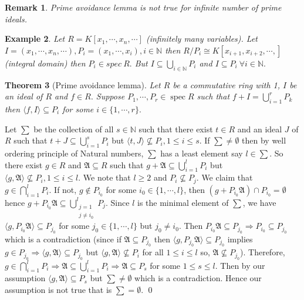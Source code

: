 \documentclass[11pt]{amsart}
\newtheorem{theorem}{Theorem}[section]
\newtheorem{example}[theorem]{Example}%
\newtheorem{remark}[theorem]{Remark}%
\newcommand{\NN}{\mathbb N}
\newcommand{\gen}[1]{\langle#1\rangle}
\DeclareMathOperator{\spec}{\text{spec}}
\begin{document}
\begin{remark}

Prime avoidance lemma is not true for infinite number of prime ideals.

\end{remark}

\begin{example}

Let $R=K[x_1,\cdots ,x_n,\cdots]$ (infinitely many variables). Let $I=(x_1,\cdots ,x_n,\cdots ),P_i=(x_1,\cdots ,x_i),i\in {\NN}$ then $R/P_i\cong K[x_{i+1},x_{i+2},\cdots ,]$ (integral domain) then $P_i\in spec~R.$ But $I\subseteq \displaystyle\bigcup_{i\in {\NN}} P_i$ and $I\subseteq P_i~\forall i\in {\NN}.$

\end{example}

\begin{theorem}[Prime avoidance lemma]

Let $R$ be a commutative ring with 1, $I$ be an ideal of $R$ and $f\in R.$ Suppose $P_1,\cdots,P_r\in\spec R$ such that $f+I=\displaystyle\bigcup_{i=1}^r P_k$ then $\gen{f,I}\subseteq P_i$ for some $i\in\{1,\cdots,r\}.$

\end{theorem}

\proof Let $\displaystyle\sum$ be the collection of all $s\in{\NN}$ such that there exist $t\in R$ and an ideal $J$ of $R$ such that $t+J\subseteq \displaystyle\bigcup_{i=1}^s P_i$ but $\gen{t,J}\nsubseteq P_i,1\leq i\leq s.$ If $\displaystyle\sum\neq\emptyset$ then by well ordering principle of Natural numbers, $\displaystyle\sum$ has a least element say $l\in \displaystyle\sum.$ So there exist $g\in R$ and $\mathfrak{A}\subseteq R$ such that $g+\mathfrak{A}\subseteq \displaystyle\bigcup_{i=1}^l P_i$ but $\gen{g,\mathfrak{A}}\nsubseteq P_i,1\leq i\leq l.$ We note that $l\geq 2$ and $P_i\nsubseteq P_j.$ We claim that $g\in\displaystyle\bigcap_{i=1}^l P_i.$ If not, $g\notin P_{i_0}$ for some $i_0\in\{1,\cdots,l\}$, then $(g+P_{i_0}\mathfrak{A})\cap P_{i_0}=\emptyset$ hence $g+P_{i_0}\mathfrak{A}\subseteq \displaystyle\bigcup_{\substack{j=1\\j\neq i_0}}^l P_j.$ Since $l$ is the minimal element of $\displaystyle\sum$, we have $\gen{g,P_{i_0}\mathfrak{A}}\subseteq P_{j_0}$ for some $j_0\in\{1,\cdots, l\}$ but $j_0\neq i_0.$ Then $P_{i_0}\mathfrak{A}\subseteq P_{j_0} \Rightarrow P_{i_0}\subseteq P_{j_0}$ which is a contradiction (since if $\mathfrak{A}\subseteq P_{j_0}$ then $\gen{g,P_{j_0}\mathfrak{A}}\subseteq P_{j_0}$ implies $g\in P_{j_0} \Rightarrow \gen{g,\mathfrak{A}}\subseteq P_{j_0}$ but $\gen{g,\mathfrak{A}}\nsubseteq P_i$ for all $1\leq i\leq l$ so, $\mathfrak{A}\nsubseteq P_{j_0}$). Therefore, $g\in\displaystyle\bigcap_{i=1}^l P_i \Rightarrow \mathfrak{A}\subseteq \displaystyle\bigcup_{i=1}^l P_i\Rightarrow \mathfrak{A}\subseteq P_s$ for some $1\leq s\leq l.$ Then by our assumption $\gen{g,\mathfrak{A}}\subseteq P_s$ but $\displaystyle\sum\neq \emptyset$ which is a contradiction. Hence our assumption is not true that is $\displaystyle\sum=\emptyset.$ \qed
\end{document}
